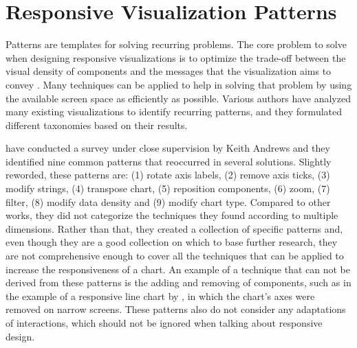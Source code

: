 \section{Responsive Visualization Patterns}

Patterns are templates for solving recurring problems. The core problem to solve when designing responsive visualizations is to optimize the trade-off between the visual density of components and the messages that the visualization aims to convey \parencite{DesignPatternsTradeOffsRespVis}. Many techniques can be applied to help in solving that problem by using the available screen space as efficiently as possible. Various authors have analyzed many existing visualizations to identify recurring patterns, and they formulated different taxonomies based on their results.

\cite{RespVisSurvey} have conducted a survey under close supervision by Keith Andrews \parencite{RespVis} and they identified nine common patterns that reoccurred in several solutions. Slightly reworded, these patterns are: (1) rotate axis labels, (2) remove axis ticks, (3) modify strings, (4) transpose chart, (5) reposition components, (6) zoom, (7) filter, (8) modify data density and (9) modify chart type. Compared to other works, they did not categorize the techniques they found according to multiple dimensions. Rather than that, they created a collection of specific patterns and, even though they are a good collection on which to base further research, they are not comprehensive enough to cover all the techniques that can be applied to increase the responsiveness of a chart. An example of a technique that can not be derived from these patterns is the adding and removing of components, such as in the example of a responsive line chart by \cite{RespVis}, in which the chart's axes were removed on narrow screens. These patterns also do not consider any adaptations of interactions, which should not be ignored when talking about responsive design.

